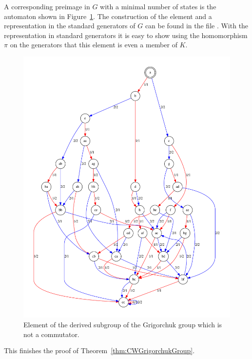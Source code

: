 \documentclass[a4paper,11pt]{amsart}
\begin{document}
 A corresponding preimage in $G$ with a minimal number of states is the automaton shown in Figure~\ref{fig:noncomm}. 
The construction of the element and a representation in the standard generators of $G$ can be found in the file
 . With the representation in standard generators it is easy to show using the 
 homomorphism $\pi$ on the generators that this element is even a member of $K$.
\begin{figure}
 \includegraphics[width=\textwidth]{gap/PCD/noncomm29states}
 \caption{Element of the derived subgroup of the Grigorchuk group which is not a commutator.}\label{fig:noncomm}
\end{figure}
This finishes the proof of Theorem~\ref{thm:CWGrigorchukGroup}.
\end{document}
